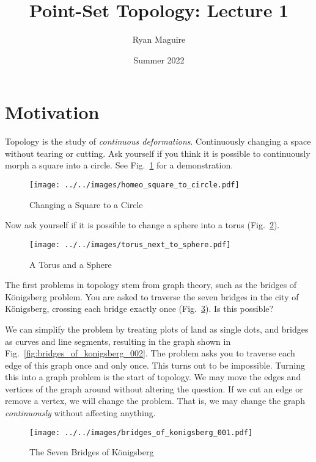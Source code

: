 \documentclass{article}
\title{Point-Set Topology: Lecture 1}
\author{Ryan Maguire}
\date{Summer 2022}
\theoremstyle{plain}
\theoremstyle{normal}
\begin{document}
    \maketitle
    \section{Motivation}
        Topology is the study of \textit{continuous deformations}. Continuously
        changing a space without tearing or cutting. Ask yourself if you think
        it is possible to continuously morph a square into a circle.
        See Fig.~\ref{fig:homeo_square_to_circle} for a demonstration.
        \begin{figure}[H]
            \centering
            \texttt{[image: ../../images/homeo\_square\_to\_circle.pdf]}
            \caption{Changing a Square to a Circle}
            \label{fig:homeo_square_to_circle}
        \end{figure}
        Now ask yourself if it is possible to change a sphere into a torus
        (Fig.~\ref{fig:torus_next_to_sphere}).
        \begin{figure}[H]
            \centering
            \texttt{[image: ../../images/torus\_next\_to\_sphere.pdf]}
            \caption{A Torus and a Sphere}
            \label{fig:torus_next_to_sphere}
        \end{figure}
        The first problems in topology
        stem from graph theory, such as the bridges of K\"{o}nigsberg
        problem. You are asked to traverse the seven bridges in the city of
        K\"{o}nigsberg, crossing each bridge exactly once
        (Fig.~\ref{fig:bridges_of_konigsberg_001}). Is this possible?
        \par\hfill\par
        We can simplify the problem by treating plots of land as single dots,
        and bridges as curves and line segments, resulting in the graph
        shown in Fig.~\ref{fig:bridges_of_konigsberg_002}. The problem asks you
        to traverse each edge of this graph once and only once. This turns
        out to be impossible. Turning this into a graph problem is the
        start of topology. We may move the edges and vertices of the graph
        around without altering the question. If we cut an edge or remove a
        vertex, we will change the problem. That is, we may change the graph
        \textit{continuously} without affecting anything.
        \begin{figure}
            \centering
            \texttt{[image: ../../images/bridges\_of\_konigsberg\_001.pdf]}
            \caption{The Seven Bridges of K\"{o}nigsberg}
            \label{fig:bridges_of_konigsberg_001}
        \end{figure}
\end{document}
